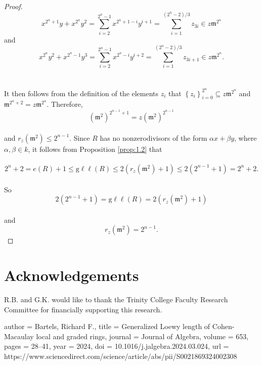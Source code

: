 \documentclass{amsart}
\theoremstyle{definition}
\theoremstyle{definition}
\numberwithin{equation}{section}
\theoremstyle{definition}
\begin{document}
{\begin{proof}
\[
x^{2^n+1}y + x^{2^n}y^2=\sum\limits_{i=2}^{2^n -1} x^{2^n+1-i}y^{i+1} = \sum\limits_{i=1}^{(2^n-2)/3} z_{3i} \in z \mathfrak{m}^{2^n}
\] and 
\[
x^{2^n}y^2 + x^{2^n-1}y^3=\sum\limits_{i=2}^{2^n -1} x^{2^n-i}y^{i+2} = \sum\limits_{i=1}^{(2^n-2)/3} z_{3i+1} \in z \mathfrak{m}^{2^n}.
\] \text{}\\\\ It then follows from the definition of the elements $z_i$ that $\left\{z_i \right\}_{i=0}^{2^n} \subseteq z \mathfrak{m}^{2^n}$ and $\mathfrak{m}^{2^n+2}=z \mathfrak{m}^{2^n}$. Therefore, 
\[
\left(\mathfrak{m}^2 \right)^{2^{n-1}+1}=z \left(\mathfrak{m}^2 \right)^{2^{n-1}}
\]\text{}\\ and $r_{z}(\mathfrak{m}^2) \leq 2^{n-1}$. Since $R$ has no nonzerodivisors of the form $\alpha x+\beta y$, where $\alpha, \beta \in k$, it follows from Proposition \ref{prop:1.2} that \\\\
\[
2^n+2=e(R)+1 \leq \text{g}\ell\ell(R) \leq 2(r_{z}(\mathfrak{m}^2)+1) \leq 2(2^{n-1}+1)=2^n+2.
\] \text{}\\ So  
\[
2(2^{n-1}+1)=\text{g}\ell\ell(R)=2(r_{z}(\mathfrak{m}^2)+1)
\] \text{}\\ and
\[
r_{z}(\mathfrak{m}^2)=2^{n-1}.
\] 
\end{proof}
\text{}

\section*{Acknowledgements}
R.B. and G.K. would like to thank the Trinity College Faculty Research Committee for financially supporting this research.
\text{} \\
\begin{bibdiv}
    \begin{biblist}

{
 author    = {Bartels, Richard F.},
  title     = {Generalized Loewy length of Cohen-Macaulay local and graded rings},
  journal   = {Journal of Algebra},
  volume    = {653},
  pages     = {28--41},
  year      = {2024},
  doi       = {10.1016/j.jalgebra.2024.03.024},
  url       = {https://www.sciencedirect.com/science/article/abs/pii/S0021869324002308}
}


    








\end{biblist}
\end{bibdiv}}
\end{document}
